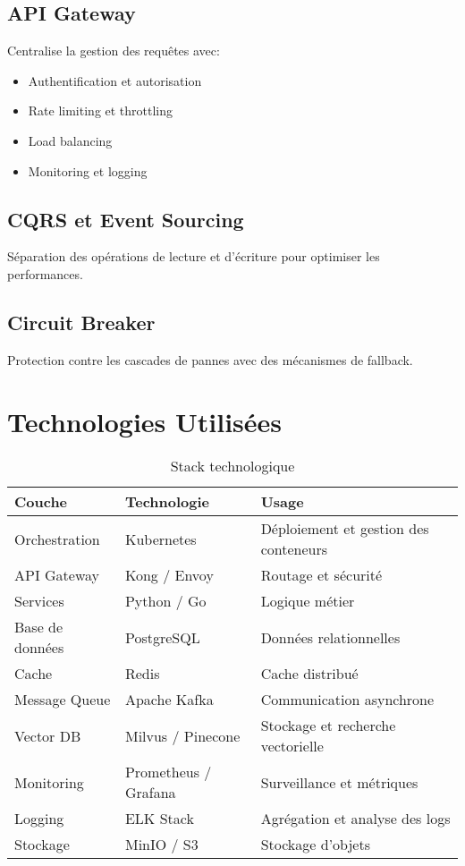 \documentclass[12pt,a4paper]{article}
\begin{document}
\subsection{API Gateway}
Centralise la gestion des requêtes avec:
\begin{itemize}
    \item Authentification et autorisation
    \item Rate limiting et throttling
    \item Load balancing
    \item Monitoring et logging
\end{itemize}

\subsection{CQRS et Event Sourcing}
Séparation des opérations de lecture et d'écriture pour optimiser les performances.

\subsection{Circuit Breaker}
Protection contre les cascades de pannes avec des mécanismes de fallback.

\newpage
\section{Technologies Utilisées}
\begin{table}[H]
\centering
\renewcommand{\arraystretch}{1.3}
\begin{tabular}{|l|l|l|}
\hline
\textbf{Couche} & \textbf{Technologie} & \textbf{Usage} \\
\hline
Orchestration & Kubernetes & Déploiement et gestion des conteneurs \\
API Gateway & Kong / Envoy & Routage et sécurité \\
Services & Python / Go & Logique métier \\
Base de données & PostgreSQL & Données relationnelles \\
Cache & Redis & Cache distribué \\
Message Queue & Apache Kafka & Communication asynchrone \\
Vector DB & Milvus / Pinecone & Stockage et recherche vectorielle \\
Monitoring & Prometheus / Grafana & Surveillance et métriques \\
Logging & ELK Stack & Agrégation et analyse des logs \\
Stockage & MinIO / S3 & Stockage d’objets \\
\hline
\end{tabular}
\caption{Stack technologique}
\end{table}
\end{document}
